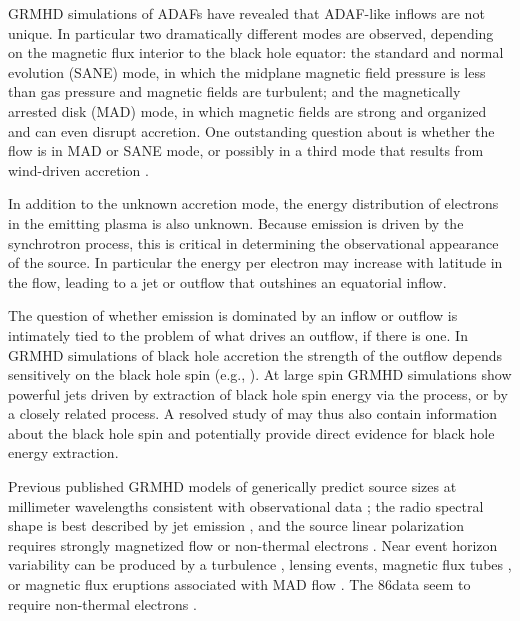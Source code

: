 GRMHD simulations of ADAFs have revealed that ADAF-like inflows are not unique.
In particular two dramatically different modes are observed, depending on the magnetic flux interior to the black hole equator: the standard and normal evolution (SANE) mode, in which the midplane magnetic field pressure is less than gas pressure and magnetic fields are turbulent; and the magnetically arrested disk (MAD) mode, in which magnetic fields are strong and organized and can even disrupt accretion.
One outstanding question about \sgra is whether the flow is in MAD or SANE mode, or possibly in a third mode that results from wind-driven accretion \citep{2020ApJ...896L...6R}.

In addition to the unknown accretion mode, the energy distribution of electrons in the emitting plasma is also unknown.
Because emission is driven by the synchrotron process, this is critical in determining the observational appearance of the source.
In particular the energy per electron may increase with latitude in the flow, leading to a jet or outflow that outshines an equatorial inflow.

The question of whether emission is dominated by an inflow or outflow is intimately tied to the problem of what drives an outflow, if there is one.
In GRMHD simulations of black hole accretion the strength of the outflow depends sensitively on the black hole spin (e.g., ).
At large spin GRMHD simulations show powerful jets driven by extraction of black hole spin energy via the \citet{1977MNRAS.179..433B} process, or by a closely related process.
A resolved study of \sgra may thus also contain information about the black hole spin and potentially provide direct evidence for black hole energy extraction.

Previous published GRMHD models of \sgra generically predict source sizes at millimeter wavelengths consistent with observational data \citep[e.g.,][]{2008Natur.455...78D, 2009ApJ...706..497M, 2009ApJ...703L.142D,2010ApJ...717.1092D};
the radio spectral shape is best described by jet emission \citep[e.g.,][]{2013A&A...559L...3M, 2017MNRAS.467.3604R}, and the source linear polarization requires strongly magnetized flow or non-thermal electrons \citep{2015Sci...350.1242J, 2017ApJ...837..180G, 2020MNRAS.494.4168D}.
Near event horizon variability can be produced by a turbulence \citep{2020MNRAS.497.4999D}, lensing events, magnetic flux tubes \citep{2015ApJ...812..103C}, or magnetic flux eruptions associated with MAD flow \citep{2011MNRAS.418L..79T}.
The 86\GHz data seem to require non-thermal electrons \citep{2018MNRAS.478.5209C, 2019ApJ...871...30I}.

